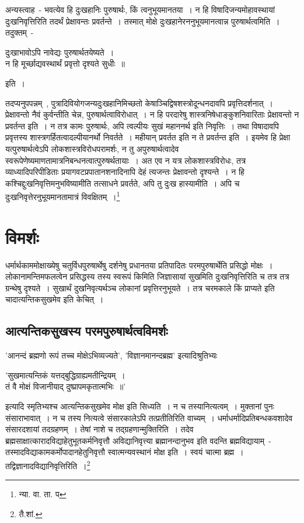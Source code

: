 		{\fontsize{11.7}{0}\selectfont\s अन्यस्त्वाह~- भवत्येव हि दुःखहानिः पुरुषार्थः, किं त्वनुभूयमानतया~। न हि विषादिजन्यमोहावस्थायां दुःखनिवृत्तिरिति तदर्थं प्रेक्षावन्तः प्रवर्तन्ते~। तस्मात् मोक्षे दुःखहानेरननुभूयमानत्वान्न पुरुषार्थत्वमिति~। तदुक्तम्~-\\ \begin{center}दुःखाभावोऽपि नावेद्यः पुरुषार्थतयेष्यते~।\\ न हि मूर्च्छाद्यवस्थार्थं प्रवृत्तो दृश्यते सुधीः~॥\end{center} इति~।}

		{\fontsize{11.7}{0}\selectfont\s तदप्यनुपपन्नम्~, पुत्रादिवियोगजन्यदुःखहानिमिच्छतो केषाञ्चिद्विषशस्त्रोदून्धनदावपि प्रवृत्तिदर्शनात्~। प्रेक्षावन्तो नैवं कुर्वन्तीति चेन्न, पुरुषार्थत्वाविरोधात्~। न हि परदारेषु शास्त्रनिषेधाङ्कुशनिवारिताः प्रेक्षावन्तो न प्रवर्तन्त इति~। न तत्र कामः पुरुषार्थः, अपि त्वल्पीयः सुखं महाननर्थ इति निवृत्तिः~। तथा विषादावपि प्रवृत्तस्य शास्त्रगर्हितत्वादल्पीयानर्थो निवर्तते~। महीयान् प्रवर्तत इति न ते प्रवर्तन्त इति~। इयमेव हि प्रेक्षा यत्पुरुषार्थत्वेऽपि लोकशास्त्रविरोधपरामर्शः, न तु अपुरुषार्थत्वादेव स्वरूपेणेष्यमाणतामात्रनिबन्धनत्वात्पुरुषर्थतायाः~। अत एव न यत्र लोकशास्त्रविरोधः, तत्र व्याध्यादिपरिपीडिताः प्रयागवटप्रपातानशनादिनापि देहं त्यजन्तः प्रेक्षावन्तो दृश्यन्ते~। न हि कश्चिद्दुःखनिवृत्तिमनुभविष्यामीति तत्साधने प्रवर्तते, अपि तु दुःख हास्यामीति~। अपि च दुःखनिवृत्तेरनुभूयमानतामात्रं विवक्षितम्~।\footnote{न्या. वा. ता. प}}


	\section{विमर्शः}

	धर्मार्थकाममोक्षाख्येषु चतुर्विधपुरुषार्थेषु दर्शनेषु प्रधानतया प्रतिपादितः परमपुरुषार्थेति प्रसिद्धो मोक्षः~। लोकानामन्तिमफलत्वेन प्रसिद्धस्य तस्य स्वरूपं किमिति जिज्ञासायां सुखमिति दुःखनिवृत्तिरिति च तत्र तत्र ग्रन्थेषु दृश्यते~। सुखार्थं दुखनिवृत्यर्थञ्च लोकानां प्रवृत्तिरनुभूयते~। तत्र चरमकाले किं प्राप्यते इति चादात्यन्तिकसुखमेव इति केचित्~।

		\subsection{आत्यन्तिकसुखस्य परमपुरुषार्थत्वविमर्शः}

		'आनन्दं ब्रह्मणो रूपं तच्च मोक्षेऽभिव्यज्यते', 'विज्ञानमानन्दब्रह्म' इत्यादिश्रुतिभ्यः\\ \begin{center}'सुखमात्यन्तिकं यत्तद्बुद्धिग्राह्यमतीन्द्रियम्~।\\ तं वै मोक्षं विजानीयाद् दुष्प्रापमकृतात्मभिः~॥'\\\end{center} इत्यादि स्मृतिभ्यश्च आत्यन्तिकसुखमेव मोक्ष इति सिध्यति~। न च तस्यानित्यत्वम्~। मुक्तानां पुनः संसाराभावात्~। न च तस्य नित्यत्वे संसारकालेऽपि तत्प्रतीतिरिति वाच्यम्~। धर्माधर्मादिप्रतिबन्धकवशादेव संसारदशायां तदग्रहणम्~। तेषां नाशे च तद्ग्रहणान्मुक्तिरिति~। तदेव ब्रह्मसाक्षात्कारादविद्याहेतुभूतकर्मनिवृत्तौ अविद्यानिवृत्त्या ब्रह्मानन्दानुभव इति वदन्ति ब्रह्मविद्यायाम्~- {\fontsize{11.7}{0}\selectfont\s तस्मादविद्याकामकर्मोपादानहेतुनिवृत्तौ स्वात्मन्यवस्थानं मोक्ष इति~। स्वयं चात्मा ब्रह्म~। तद्विज्ञानादविद्यानिवृत्तिरिति~।\footnote{तै.शां.}}


